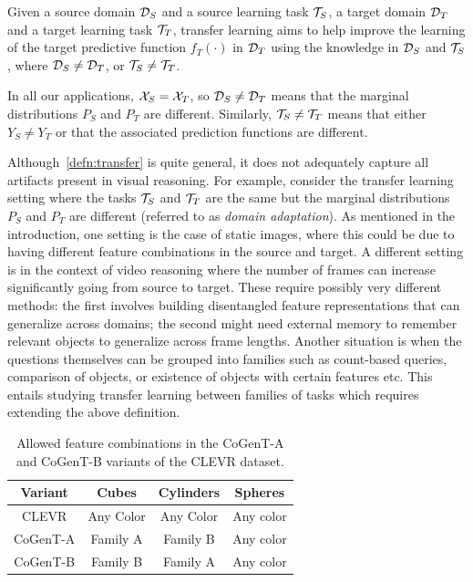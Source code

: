 \begin{definition}
	\label{defn:transfer}
	Given a source domain $\mathcal{D}_S$ and a source learning task $\mathcal{T}_S$, a target domain $\mathcal{D}_T$ and a target learning task $\mathcal{T}_T$, transfer learning aims to help improve the
	learning of the target predictive function $f_T(\cdot)$ in $\mathcal{D}_T$ using the knowledge  in $\mathcal{D}_S$ and $\mathcal{T}_S$, where $\mathcal{D}_S \ne \mathcal{D}_T$, or $\mathcal{T}_S \ne \mathcal{T}_T$.
\end{definition}
In all our applications, $\mathcal{X}_S = \mathcal{X}_T$, so $\mathcal{D}_S \ne \mathcal{D}_T$ means that the marginal distributions $P_S$ and $P_T$ are different.
Similarly, $\mathcal{T}_S \ne \mathcal{T}_T$ means that either $Y_S \ne Y_T$ or that the associated prediction functions are different.

Although~\cref{defn:transfer} is quite general, it does not adequately capture all artifacts present in visual reasoning.
For example, consider the transfer learning setting where the tasks $\mathcal{T}_S$ and $\mathcal{T}_T$ are the same
but the marginal distributions $P_S$ and $P_T$ are different (referred to as \emph{domain adaptation}).
As mentioned in the introduction, one setting is the case of static images,
where this could be due to having different feature combinations in the source and target.
A different setting is in the context of video reasoning where the number of frames can increase significantly going from source to target.
These require possibly very different methods: the first involves building disentangled feature representations that can generalize across
domains; the second might need external memory to remember relevant objects to generalize across frame lengths.
Another situation is when the questions themselves can be grouped into families such as count-based queries,
comparison of objects, or existence of objects with certain features etc.
This entails studying transfer learning between families of tasks which requires extending the above definition.

\begin{table}[b!]
	\centering
	\begin{tabular}{cccc}
		\toprule
		Variant	& Cubes	& Cylinders &	Spheres	\\
		\midrule
		CLEVR &  Any Color  & Any Color 	&	Any color  \\
		CoGenT-A &  Family A  & Family B 	&	Any color  \\
		CoGenT-B	&	Family B  &	Family A	&	Any color \\
		\bottomrule
	\end{tabular}
	\caption{Allowed feature combinations in the CoGenT-A and CoGenT-B variants of the CLEVR dataset.}%
	\label{tab:cogent_conditions}
\end{table}

